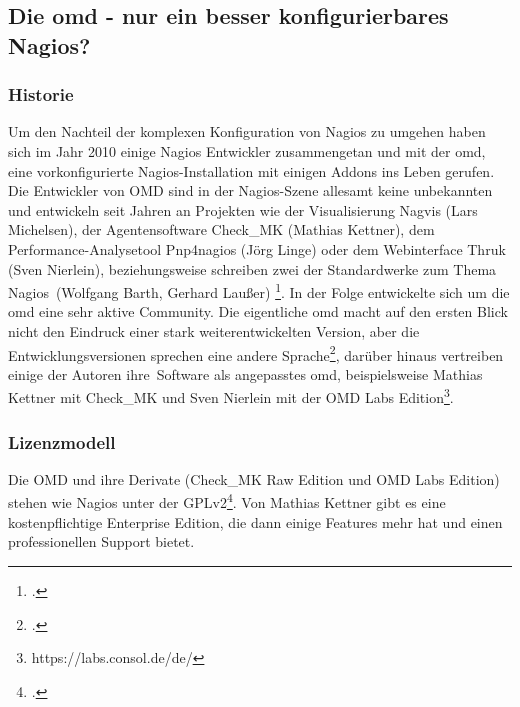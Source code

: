 \documentclass[12pt,a4paper,parskip,listof=totoc,bibliography=totoc]{scrreprt}
\begin{document}
	\subsection{Die \acrlong{omd} - nur ein besser konfigurierbares Nagios?}
	\subsubsection{Historie}
	Um den Nachteil der komplexen Konfiguration von Nagios zu umgehen haben sich im Jahr 2010 einige Nagios Entwickler zusammengetan und mit der \acrfull{omd}, eine vorkonfigurierte Nagios-Installation mit einigen Addons ins Leben gerufen. Die Entwickler von OMD sind in der Nagios-Szene allesamt keine unbekannten und entwickeln seit Jahren an Projekten wie der Visualisierung Nagvis (Lars Michelsen), der Agentensoftware Check\_MK (Mathias Kettner), dem Performance-Analysetool Pnp4nagios (Jörg Linge) oder dem Webinterface Thruk (Sven Nierlein), beziehungsweise schreiben zwei der Standardwerke zum Thema \glqq Nagios\grqq\ (Wolfgang Barth, Gerhard Laußer) \footcite{omdhistory}. In der Folge entwickelte sich um die \acrshort{omd} eine sehr aktive Community. Die eigentliche \acrlong{omd} macht auf den ersten Blick nicht den Eindruck einer stark weiterentwickelten Version, aber die Entwicklungsversionen sprechen eine andere Sprache\footcite{omdrepo}, darüber hinaus vertreiben einige der Autoren \glqq ihre\grqq\ Software als angepasstes \acrshort{omd}, beispielsweise Mathias Kettner mit Check\_MK und Sven Nierlein mit der OMD Labs Edition\footnote{https://labs.consol.de/de/}.
	\subsubsection{Lizenzmodell}
	Die OMD und ihre Derivate (Check\_MK Raw Edition und OMD Labs Edition) stehen wie Nagios unter der GPLv2\footcite{checkmkcre}. Von Mathias Kettner gibt es eine kostenpflichtige Enterprise Edition, die dann einige Features mehr hat und einen professionellen Support bietet.
\end{document}
